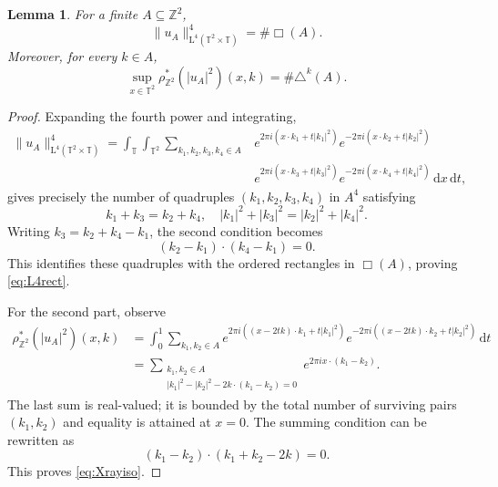 \documentclass[10pt,a4paper]{amsart}
\newtheorem{lemma}[theorem]{Lemma}
\numberwithin{equation}{section}
\newcommand{\dd}{\,\mathrm{d}}
\begin{document}
\begin{lemma}\label{lem:counts}
For a finite $A\subseteq\mathbb{Z}^2$,
\begin{equation}\label{eq:L4rect}
\|u_A\|_{\mathrm{L}^4(\mathbb{T}^2\times\mathbb{T})}^4 = \#\Box(A).
\end{equation}
Moreover, for every $k\in A$,
\begin{equation}\label{eq:Xrayiso}
\sup_{x\in\mathbb{T}^2}\rho^{\ast}_{\mathbb{Z}^2}(|u_A|^2)(x,k) = \#\triangle^k(A).
\end{equation}
\end{lemma}

\begin{proof}
Expanding the fourth power and integrating,
\begin{align*} 
\|u_A\|_{\mathrm{L}^4(\mathbb{T}^2\times\mathbb{T})}^4 =   \int_{\mathbb{T}} \int_{\mathbb{T}^2} \sum_{k_1,k_2,k_3,k_4\in A} & e^{2\pi i(x\cdot k_1+t|k_1|^2)} e^{-2\pi i(x\cdot k_2+t|k_2|^2)} \\
& e^{2\pi i(x\cdot k_3+t|k_3|^2)} e^{-2\pi i(x\cdot k_4+t|k_4|^2)} \dd x \dd t, 
\end{align*}
gives precisely the number of quadruples $(k_1,k_2,k_3,k_4)$ in $A^4$ satisfying
\[ k_1+k_3=k_2+k_4, \quad |k_1|^2+|k_3|^2=|k_2|^2+|k_4|^2. \]
Writing $k_3=k_2+k_4-k_1$, the second condition becomes
\[ (k_2-k_1)\cdot(k_4-k_1)=0. \]
This identifies these quadruples with the ordered rectangles in $\Box(A)$, proving \eqref{eq:L4rect}.

For the second part, observe
\begin{align*}
\rho^{\ast}_{\mathbb{Z}^2}(|u_A|^2)(x,k)
& =\int_0^1 \sum_{k_1,k_2\in A} e^{2\pi i((x-2tk)\cdot k_1+t|k_1|^2)} e^{-2\pi i((x-2tk)\cdot k_2+t|k_2|^2)} \dd t \\
& =\sum_{\substack{k_1,k_2\in A\\
|k_1|^2-|k_2|^2-2k\cdot(k_1-k_2)=0}}e^{2\pi ix\cdot(k_1-k_2)}.
\end{align*}
The last sum is real-valued; it is bounded by the total number of surviving pairs $(k_1,k_2)$ and equality is attained at $x=0$. The summing condition can be rewritten as
\[ (k_1-k_2)\cdot(k_1+k_2-2k)=0. \]
This proves \eqref{eq:Xrayiso}.
\end{proof}
\end{document}
